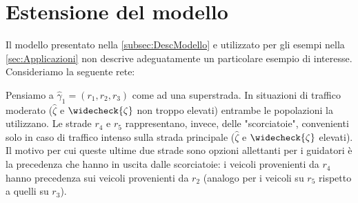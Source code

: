 \section{Estensione del modello}
\label{sec:Critica}
Il modello presentato nella \autoref{subsec:DescModello} e utilizzato per gli esempi nella \autoref{sec:Applicazioni} non descrive adeguatamente un particolare esempio di interesse.
Consideriamo la seguente rete:
\begin{figure}[h!]
\centering


\end{figure}

Pensiamo a $\widehat{\gamma}_1=(r_1, r_2, r_3)$ come ad una superstrada. In situazioni di traffico moderato ($\widehat{\zeta}$ e $\widecheck{\zeta}$ non troppo elevati) entrambe le popolazioni la utilizzano.
Le strade $r_4$ e $r_5$ rappresentano, invece, delle "scorciatoie", convenienti solo in caso di traffico intenso sulla strada principale ($\widehat{\zeta}$ e $\widecheck{\zeta}$ elevati). Il motivo
per cui queste ultime due strade sono opzioni allettanti per i guidatori è la precedenza che hanno in uscita dalle scorciatoie: i veicoli provenienti da $r_4$ hanno precedenza sui veicoli
provenienti da $r_2$ (analogo per i veicoli su $r_5$ rispetto a quelli su $r_3$).

